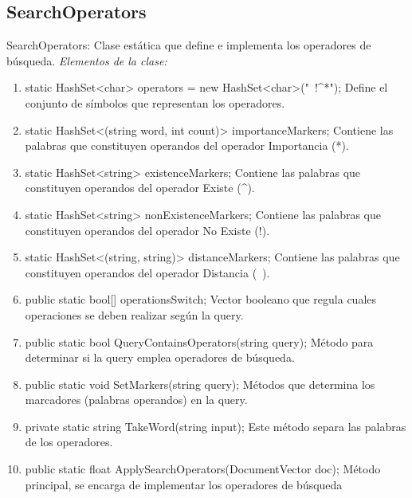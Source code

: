 \documentclass[a4paper,12pt,twocolumn]{article}
\begin{document}
\subsection{SearchOperators}
SearchOperators: Clase estática que define e implementa los operadores de
búsqueda.
\emph{Elementos de la clase:}
\begin{enumerate}
    \item static HashSet<char> operators = new HashSet<char>("~!^*");
    Define el conjunto de símbolos que representan los operadores.
    \item static HashSet<(string word, int count)> importanceMarkers;
    Contiene las palabras que constituyen operandos del operador Importancia (*).
    \item static HashSet<string> existenceMarkers;
    Contiene las palabras que constituyen operandos del operador Existe (^).
    \item static HashSet<string> nonExistenceMarkers;
     Contiene las palabras que constituyen operandos del operador No Existe (!).
     \item static HashSet<(string, string)> distanceMarkers;
    Contiene las palabras que constituyen operandos del operador Distancia (~).
    \item public static bool[] operationsSwitch;
    Vector booleano que regula cuales operaciones se deben realizar según la query.
    \item public static bool QueryContainsOperators(string query);
    Método para determinar si la query emplea operadores de búsqueda.
    \item public static void SetMarkers(string query);
    Métodos que determina los marcadores (palabras operandos) en la query.
    \item private static string TakeWord(string input);
    Este método separa las palabras de los operadores.
    \item public static float ApplySearchOperators(DocumentVector doc);
    Método principal, se encarga de implementar los operadores de búsqueda
\end{enumerate}
\end{document}
